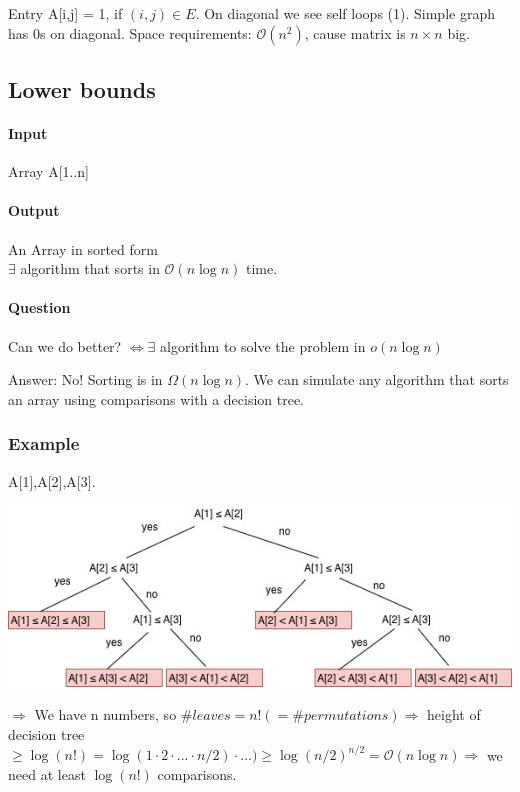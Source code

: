 Entry A[i,j] = 1, if $(i,j) \in E$. On diagonal we see self loops (1). Simple graph has 0s on diagonal. Space requirements: $\mathcal{O}(n^2)$, cause matrix is $ n \times n $ big.

\subsection{Lower bounds}

\paragraph{Input} Array A[1..n]

\paragraph{Output} An Array in sorted form \\

$\exists$ algorithm that sorts in $\mathcal{O}(n\log n)$ time. \paragraph{Question} Can we do better? $\Leftrightarrow \exists$ algorithm to solve the problem in $o(n\log n)$

Answer: No! Sorting is in $\Omega(n \log n)$. We can simulate any algorithm that sorts an array using comparisons with a decision tree. 

\subsubsection{Example}
A[1],A[2],A[3]. 
\begin{center}
	\includegraphics[scale=0.5]{img/decisiontree1}
\end{center}
$\Rightarrow$ We have n numbers, so $\#leaves = n! ( = \#permutations) \Rightarrow$ height of decision tree $\geq \log(n!) = \log(1 \cdot  2 \cdot ...\cdot n/2) \cdot ...) \geq \log(n/2)^{n/2} = \mathcal{O}(n \log n) \Rightarrow $ we need at least $\log(n!)$ comparisons.

